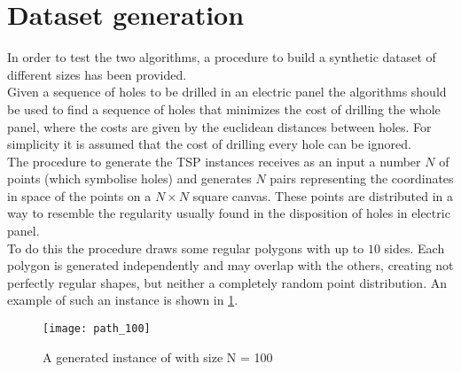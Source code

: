 
\section{Dataset generation}
In order to test the two algorithms, a procedure to build a synthetic dataset of different sizes has been provided.\\ 
Given a sequence of holes to be drilled in an electric panel the algorithms should be used to find a sequence of holes that minimizes the cost of drilling the whole panel, where the costs are given by the euclidean distances between holes. For simplicity it is assumed that the cost of drilling every hole can be ignored.\\
The procedure to generate the TSP instances receives as an input a number $N$ of points (which symbolise holes) and generates $N$ pairs representing the coordinates in space of the points on a $N\times N$ square canvas. These points are distributed in a way to resemble the regularity usually found in the disposition of holes in electric panel.\\ 
To do this the procedure draws some regular polygons with up to $10$ sides. Each polygon is generated independently and may overlap with the others, creating not perfectly regular shapes, but neither a completely random point distribution. An example of such an instance is shown in \cref{fig:dataexample}.

\begin{figure}[]
	\centering
	\texttt{[image: path\_100]}
	\caption{A generated instance of with size N = 100}
	\label{fig:dataexample}
\end{figure}

